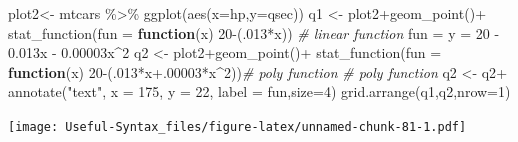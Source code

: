 \documentclass[
]{article}
\newenvironment{Shaded}{\begin{snugshade}}{\end{snugshade}}
\newcommand{\AttributeTok}[1]{\textcolor[rgb]{0.77,0.63,0.00}{#1}}
\newcommand{\CommentTok}[1]{\textcolor[rgb]{0.56,0.35,0.01}{\textit{#1}}}
\newcommand{\ControlFlowTok}[1]{\textcolor[rgb]{0.13,0.29,0.53}{\textbf{#1}}}
\newcommand{\DecValTok}[1]{\textcolor[rgb]{0.00,0.00,0.81}{#1}}
\newcommand{\FloatTok}[1]{\textcolor[rgb]{0.00,0.00,0.81}{#1}}
\newcommand{\FunctionTok}[1]{\textcolor[rgb]{0.00,0.00,0.00}{#1}}
\newcommand{\NormalTok}[1]{#1}
\newcommand{\OtherTok}[1]{\textcolor[rgb]{0.56,0.35,0.01}{#1}}
\newcommand{\SpecialCharTok}[1]{\textcolor[rgb]{0.00,0.00,0.00}{#1}}
\newcommand{\StringTok}[1]{\textcolor[rgb]{0.31,0.60,0.02}{#1}}
\begin{document}
\begin{Shaded}
\begin{Highlighting}[]
\NormalTok{plot2}\OtherTok{\textless{}{-}}\NormalTok{ mtcars }\SpecialCharTok{\%\textgreater{}\%} \FunctionTok{ggplot}\NormalTok{(}\FunctionTok{aes}\NormalTok{(}\AttributeTok{x=}\NormalTok{hp,}\AttributeTok{y=}\NormalTok{qsec))}
\NormalTok{q1 }\OtherTok{\textless{}{-}}\NormalTok{ plot2}\SpecialCharTok{+}\FunctionTok{geom\_point}\NormalTok{()}\SpecialCharTok{+}
    \FunctionTok{stat\_function}\NormalTok{(}\AttributeTok{fun =} \ControlFlowTok{function}\NormalTok{(x) }\DecValTok{20}\SpecialCharTok{{-}}\NormalTok{(.}\DecValTok{013}\SpecialCharTok{*}\NormalTok{x)) }\CommentTok{\# linear function}
\NormalTok{fun }\OtherTok{=} \StringTok{\textquotesingle{}y = 20 {-} 0.013x {-} 0.00003x\^{}2\textquotesingle{}}
\NormalTok{q2 }\OtherTok{\textless{}{-}}\NormalTok{ plot2}\SpecialCharTok{+}\FunctionTok{geom\_point}\NormalTok{()}\SpecialCharTok{+}    \FunctionTok{stat\_function}\NormalTok{(}\AttributeTok{fun =} \ControlFlowTok{function}\NormalTok{(x) }\DecValTok{20}\SpecialCharTok{{-}}\NormalTok{(.}\DecValTok{013}\SpecialCharTok{*}\NormalTok{x}\FloatTok{+.00003}\SpecialCharTok{*}\NormalTok{x}\SpecialCharTok{\^{}}\DecValTok{2}\NormalTok{))}\CommentTok{\# poly function}
 \CommentTok{\# poly function}
\NormalTok{q2 }\OtherTok{\textless{}{-}}\NormalTok{ q2}\SpecialCharTok{+} \FunctionTok{annotate}\NormalTok{(}\StringTok{"text"}\NormalTok{, }\AttributeTok{x =} \DecValTok{175}\NormalTok{, }\AttributeTok{y =} \DecValTok{22}\NormalTok{, }\AttributeTok{label =}\NormalTok{ fun,}\AttributeTok{size=}\DecValTok{4}\NormalTok{)}
\FunctionTok{grid.arrange}\NormalTok{(q1,q2,}\AttributeTok{nrow=}\DecValTok{1}\NormalTok{)}
\end{Highlighting}
\end{Shaded}

\texttt{[image: Useful-Syntax\_files/figure-latex/unnamed-chunk-81-1.pdf]}
\end{document}
